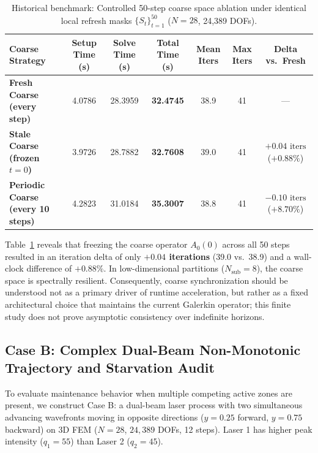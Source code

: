\documentclass[preprint,12pt,3p]{elsarticle}
\begin{document}
\begin{table}[htbp]
\centering
\small
\caption{Historical benchmark: Controlled 50-step coarse space ablation under identical local refresh masks $\{S_t\}_{t=1}^{50}$ ($N=28$, 24,389 DOFs).}
\label{tab:coarse_ablation_50step}
\begin{tabular}{lcccccc}
\toprule
\textbf{Coarse Strategy} & \textbf{Setup Time (s)} & \textbf{Solve Time (s)} & \textbf{Total Time (s)} & \textbf{Mean Iters} & \textbf{Max Iters} & \textbf{Delta vs.\ Fresh} \\
\midrule
\textbf{Fresh Coarse (every step)} & 4.0786 & 28.3959 & \textbf{32.4745} & 38.9 & 41 & --- \\
\textbf{Stale Coarse (frozen $t=0$)} & 3.9726 & 28.7882 & \textbf{32.7608} & 39.0 & 41 & $+0.04\text{ iters}$ ($+0.88\%$) \\
\textbf{Periodic Coarse (every 10 steps)} & 4.2823 & 31.0184 & \textbf{35.3007} & 38.8 & 41 & $-0.10\text{ iters}$ ($+8.70\%$) \\
\bottomrule
\end{tabular}
\end{table}

Table~\ref{tab:coarse_ablation_50step} reveals that freezing the coarse operator $A_0(0)$ across all 50 steps resulted in an iteration delta of only \textbf{$+0.04$ iterations} (39.0 vs.\ 38.9) and a wall-clock difference of \textbf{$+0.88\%$}. In low-dimensional partitions ($N_{\text{sub}}=8$), the coarse space is spectrally resilient. Consequently, coarse synchronization should be understood not as a primary driver of runtime acceleration, but rather as a fixed architectural choice that maintains the current Galerkin operator; this finite study does not prove asymptotic consistency over indefinite horizons.

\subsection{Case B: Complex Dual-Beam Non-Monotonic Trajectory and Starvation Audit}
\label{subsec:case_b_dual_beam}

To evaluate maintenance behavior when multiple competing active zones are present, we construct Case B: a dual-beam laser process with two simultaneous advancing wavefronts moving in opposite directions ($y=0.25$ forward, $y=0.75$ backward) on 3D FEM ($N=28$, $24,389$ DOFs, 12 steps). Laser 1 has higher peak intensity ($q_1 = 55$) than Laser 2 ($q_2 = 45$).
\end{document}
